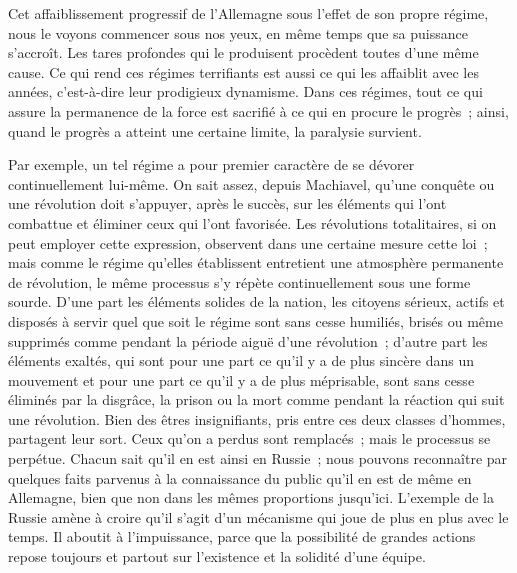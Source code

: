 \documentclass[french,twoside]{book} %
\begin{document}
Cet affaiblissement progressif de l'Allemagne sous l'effet de son propre régime, nous le voyons commencer sous nos yeux, en même temps que sa puissance s'accroît. Les tares profondes qui le produisent procèdent toutes d'une même cause. Ce qui rend ces régimes terrifiants est aussi ce qui les affaiblit avec les années, c'est-à-dire leur prodigieux dynamisme. Dans ces régimes, tout ce qui assure la permanence de la force est sacrifié à ce qui en procure le progrès ; ainsi, quand le progrès a atteint une certaine limite, la paralysie survient.\par
Par exemple, un tel régime a pour premier caractère de se dévorer continuellement lui-même. On sait assez, depuis Machiavel, qu'une conquête ou une révolution doit s'appuyer, après le succès, sur les éléments qui l'ont combattue et éliminer ceux qui l'ont favorisée. Les révolutions totalitaires, si on peut employer cette expression, observent dans une certaine mesure cette loi ; mais comme le régime qu'elles établissent entretient une atmosphère permanente de révolution, le même processus s'y répète continuellement sous une forme sourde. D'une part les éléments solides de la nation, les citoyens sérieux, actifs et disposés à servir quel que soit le régime sont sans cesse humiliés, brisés ou même supprimés comme pendant la période aiguë d'une révolution ; d'autre part les éléments exaltés, qui sont pour une part ce qu'il y a de plus sincère dans un mouvement et pour une part ce qu'il y a de plus méprisable, sont sans cesse éliminés par la disgrâce, la prison ou la mort comme pendant la réaction qui suit une révolution. Bien des êtres insi­gnifiants, pris entre ces deux classes d'hommes, partagent leur sort. Ceux qu'on a perdus sont remplacés ; mais le processus se perpétue. Chacun sait qu'il en est ainsi en Russie ; nous pouvons reconnaître par quelques faits parvenus à la connaissance du public qu'il en est de même en Allemagne, bien que non dans les mêmes proportions jusqu'ici. L'exemple de la Russie amène à croire qu'il s'agit d'un mécanisme qui joue de plus en plus avec le temps. Il aboutit à l'impuissance, parce que la possibilité de grandes actions repose toujours et partout sur l'existence et la solidité d'une équipe.\par
\end{document}
